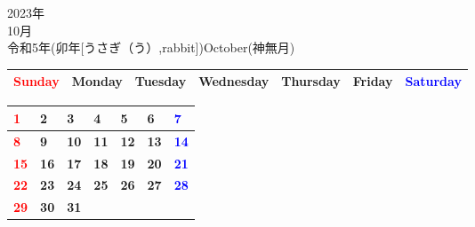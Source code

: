 \documentclass[a4paper,landscape]{jsarticle}
\newcommand{\dig}{\hspace{29mm}}
\newcommand{\tdig}{\hspace{27mm}}
\newcommand{\LBF}{\LARGE\textbf}
\begin{document}
\newpage

\begin{center}
	\HUGE 2023年\\
	\huge 10月\\
	\large 令和5年(卯年[うさぎ（う）,rabbit])October(神無月)
\end{center}

\begingroup
\renewcommand{\arraystretch}{1.4}
\begin{tabular}{|>{\centering\arraybackslash}p{32mm}|>{\centering\arraybackslash}p{32mm}|>{\centering\arraybackslash}p{32mm}|>{\centering\arraybackslash}p{32mm}|>{\centering\arraybackslash}p{32mm}|>{\centering\arraybackslash}p{32mm}|>{\centering\arraybackslash}p{32mm}|}
\hline
\textcolor{red}{\large Sunday}&\large Monday&\large Tuesday&\large Wednesday&\large Thursday&\large Friday&\textcolor{blue}{\large Saturday}\\
\hline
\end{tabular}
\endgroup

\begingroup
\renewcommand{\arraystretch}{4}
\begin{tabular}{|p{32mm}|p{32mm}|p{32mm}|p{32mm}|p{32mm}|p{32mm}|p{32mm}|}
\hline
\raisebox{30pt} {\dig\textcolor{red}{\LBF{1}}}&\raisebox{30pt} {\dig\LBF{2}}&\raisebox{30pt} {\dig\LBF{3}}&\raisebox{30pt} {\dig\LBF{4}}&\raisebox{30pt} {\dig\LBF{5}}&\raisebox{30pt} {\dig\LBF{6}}&\raisebox{30pt} {\dig\textcolor{blue}{\LBF{7}}}\\
\hline
\raisebox{30pt} {\dig\textcolor{red}{\LBF{8}}}&\raisebox{30pt} {\dig\LBF{9}}&\raisebox{30pt} {\tdig\LBF{10}}&\raisebox{30pt} {\tdig\LBF{11}}&\raisebox{30pt} {\tdig\LBF{12}}&\raisebox{30pt} {\tdig\LBF{13}}&\raisebox{30pt} {\tdig\textcolor{blue}{\LBF{14}}}\\
\hline
\raisebox{30pt} {\tdig\textcolor{red}{\LBF{15}}}&\raisebox{30pt} {\tdig\LBF{16}}&\raisebox{30pt} {\tdig\LBF{17}}&\raisebox{30pt} {\tdig\LBF{18}}&\raisebox{30pt} {\tdig\LBF{19}}&\raisebox{30pt} {\tdig\LBF{20}}&\raisebox{30pt} {\tdig\textcolor{blue}{\LBF{21}}}\\
\hline
\raisebox{30pt} {\tdig\textcolor{red}{\LBF{22}}}&\raisebox{30pt} {\tdig\LBF{23}}&\raisebox{30pt} {\tdig\LBF{24}}&\raisebox{30pt} {\tdig\LBF{25}}&\raisebox{30pt} {\tdig\LBF{26}}&\raisebox{30pt} {\tdig\LBF{27}}&\raisebox{30pt} {\tdig\textcolor{blue}{\LBF{28}}}\\
\hline
\raisebox{30pt} {\tdig\textcolor{red}{\LBF{29}}}&\raisebox{30pt} {\tdig\LBF{30}}&\raisebox{30pt} {\tdig\LBF{31}}&&&&\\
\hline
\end{tabular}
\endgroup
\end{document}

